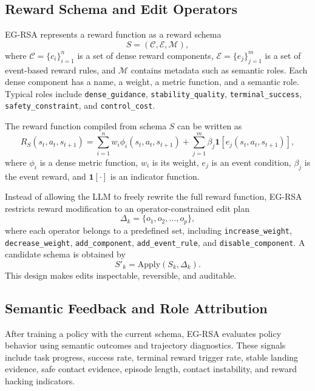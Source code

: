 \documentclass[11pt]{article}
\begin{document}
\subsection{Reward Schema and Edit Operators}

EG-RSA represents a reward function as a reward schema
\begin{equation}
S = (\mathcal{C}, \mathcal{E}, \mathcal{M}),
\end{equation}
where $\mathcal{C}=\{c_i\}_{i=1}^{n}$ is a set of dense reward components, $\mathcal{E}=\{e_j\}_{j=1}^{m}$ is a set of event-based reward rules, and $\mathcal{M}$ contains metadata such as semantic roles. Each dense component has a name, a weight, a metric function, and a semantic role. Typical roles include \texttt{dense\_guidance}, \texttt{stability\_quality}, \texttt{terminal\_success}, \texttt{safety\_constraint}, and \texttt{control\_cost}.

The reward function compiled from schema $S$ can be written as
\begin{equation}
R_S(s_t,a_t,s_{t+1})
=
\sum_{i=1}^{n} w_i \phi_i(s_t,a_t,s_{t+1})
+
\sum_{j=1}^{m} \beta_j \mathbf{1}[e_j(s_t,a_t,s_{t+1})],
\end{equation}
where $\phi_i$ is a dense metric function, $w_i$ is its weight, $e_j$ is an event condition, $\beta_j$ is the event reward, and $\mathbf{1}[\cdot]$ is an indicator function.

Instead of allowing the LLM to freely rewrite the full reward function, EG-RSA restricts reward modification to an operator-constrained edit plan
\begin{equation}
\Delta_k = \{o_1,o_2,\ldots,o_p\},
\end{equation}
where each operator belongs to a predefined set, including \texttt{increase\_weight}, \texttt{decrease\_weight}, \texttt{add\_component}, \texttt{add\_event\_rule}, and \texttt{disable\_component}. A candidate schema is obtained by
\begin{equation}
S'_k = \mathrm{Apply}(S_k,\Delta_k).
\end{equation}
This design makes edits inspectable, reversible, and auditable.

\subsection{Semantic Feedback and Role Attribution}

After training a policy with the current schema, EG-RSA evaluates policy behavior using semantic outcomes and trajectory diagnostics. These signals include task progress, success rate, terminal reward trigger rate, stable landing evidence, safe contact evidence, episode length, contact instability, and reward hacking indicators.
\end{document}
